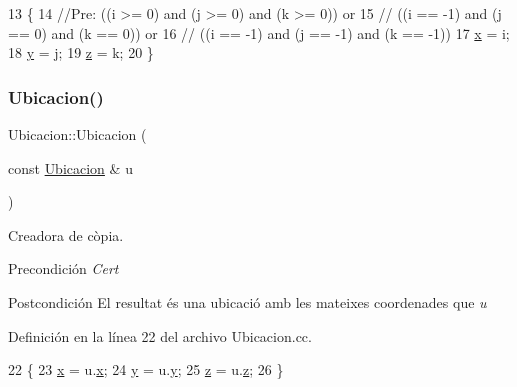 \begin{DoxyCode}
13                                         \{
14 \textcolor{comment}{//Pre:  ((i >= 0) and (j >= 0) and (k >= 0)) or}
15 \textcolor{comment}{//      ((i == -1) and (j == 0) and (k == 0)) or}
16 \textcolor{comment}{//      ((i == -1) and (j == -1) and (k == -1))}
17   \hyperlink{class_ubicacion_aa025967df0ca8761587b09a38cf5b798}{x} = i;
18   \hyperlink{class_ubicacion_ab314f05b8da651aabb8a623467919a94}{y} = j;
19   \hyperlink{class_ubicacion_ad74770f35bf4b18d3959b78cd90b6eb0}{z} = k;
20 \}
\end{DoxyCode}
\mbox{\label{class_ubicacion_abbd148f34df6cde35f0f3803c8a98660}} 
\subsubsection{\texorpdfstring{Ubicacion()}{Ubicacion()}\hspace{0.1cm}{\footnotesize\ttfamily [3/3]}}
{\footnotesize\ttfamily Ubicacion\+::\+Ubicacion (\begin{DoxyParamCaption}\item[{const \hyperlink{class_ubicacion}{Ubicacion} \&}]{u }\end{DoxyParamCaption})}



Creadora de còpia. 

\begin{DoxyPrecond}{Precondición}
{\itshape Cert} 
\end{DoxyPrecond}
\begin{DoxyPostcond}{Postcondición}
El resultat és una ubicació amb les mateixes coordenades que {\itshape u} 
\end{DoxyPostcond}


Definición en la línea 22 del archivo Ubicacion.\+cc.


\begin{DoxyCode}
22                                        \{
23   \hyperlink{class_ubicacion_aa025967df0ca8761587b09a38cf5b798}{x} = u.\hyperlink{class_ubicacion_aa025967df0ca8761587b09a38cf5b798}{x};
24   \hyperlink{class_ubicacion_ab314f05b8da651aabb8a623467919a94}{y} = u.\hyperlink{class_ubicacion_ab314f05b8da651aabb8a623467919a94}{y};
25   \hyperlink{class_ubicacion_ad74770f35bf4b18d3959b78cd90b6eb0}{z} = u.\hyperlink{class_ubicacion_ad74770f35bf4b18d3959b78cd90b6eb0}{z};
26 \}
\end{DoxyCode}
\mbox{\label{class_ubicacion_a90a99154b92c9c89053b752f775618d1}} 
